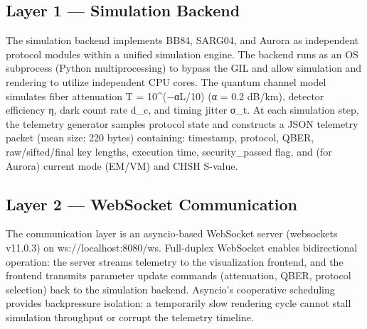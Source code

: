 \begin{figure}[hbt!]
\centering
{}
\end{figure}
\subsection{Layer 1 — Simulation Backend}
The simulation backend implements BB84, SARG04, and Aurora as independent protocol modules within a unified simulation engine. The backend runs as an OS subprocess (Python multiprocessing) to bypass the GIL and allow simulation and rendering to utilize independent CPU cores. The quantum channel model simulates fiber attenuation T = 10^(−αL/10) (α = 0.2 dB/km), detector efficiency η, dark count rate d_c, and timing jitter σ_t. At each simulation step, the telemetry generator samples protocol state and constructs a JSON telemetry packet (mean size: 220 bytes) containing: timestamp, protocol, QBER, raw/sifted/final key lengths, execution time, security_passed flag, and (for Aurora) current mode (EM/VM) and CHSH S-value.

\subsection{Layer 2 — WebSocket Communication}
The communication layer is an asyncio-based WebSocket server (websockets v11.0.3) on ws://localhost:8080/ws. Full-duplex WebSocket enables bidirectional operation: the server streams telemetry to the visualization frontend, and the frontend transmits parameter update commands (attenuation, QBER, protocol selection) back to the simulation backend. Asyncio's cooperative scheduling provides backpressure isolation: a temporarily slow rendering cycle cannot stall simulation throughput or corrupt the telemetry timeline.

